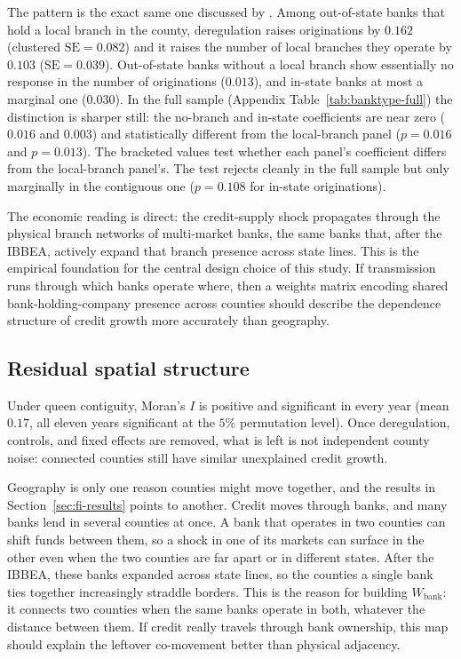The pattern is the exact same one discussed by \cite{favara2015}. Among out-of-state banks that hold a
local branch in the county, deregulation raises originations by $0.162$ (clustered
$\mathrm{SE}=0.082$) and it raises the number of
local branches they operate by $0.103$ ($\mathrm{SE}=0.039$).
Out-of-state banks without a local branch show essentially no response in the number of originations ($0.013$),
and in-state banks at most a marginal one ($0.030$). In the full sample (Appendix
Table~\ref{tab:banktype-full}) the distinction is sharper still: the no-branch and
in-state coefficients are near zero ($0.016$ and $0.003$) and statistically
different from the local-branch panel ($p=0.016$ and $p=0.013$). The bracketed values test whether each panel's coefficient differs from the
local-branch panel's. The test rejects cleanly in the full sample but only
marginally in the contiguous one ($p=0.108$ for in-state originations).

The economic reading is direct: the credit-supply shock propagates through the
physical branch networks of multi-market banks, the same banks that, after the
IBBEA, actively expand that branch presence across state lines. This is the
empirical foundation for the central design choice of this study. If transmission runs through which banks operate where, then a weights
matrix encoding shared bank-holding-company presence across counties should describe the dependence structure of credit
growth more accurately than geography.

\subsection{Residual spatial structure}
\label{sec:diag-results}
Under
queen contiguity, Moran's $I$ is positive and significant in every year (mean
$0.17$, all eleven years significant at the $5\%$ permutation level). Once
deregulation, controls, and fixed effects are removed, what is left is not
independent county noise: connected counties still have similar unexplained
credit growth.

Geography is only one reason counties might move together, and the results in
Section~\ref{sec:fi-results} points to another. Credit moves through banks, and
many banks lend in several counties at once. A bank that operates in two counties
can shift funds between them, so a shock in one of its markets can surface in the
other even when the two counties are far apart or in different states. After the
IBBEA, these banks expanded across state lines, so the counties a single bank ties
together increasingly straddle borders. This is the reason for building
$W_{\text{bank}}$: it connects two counties when the same banks operate in both,
whatever the distance between them. If credit really travels through bank ownership, this map should explain the leftover co-movement better than physical
adjacency.

